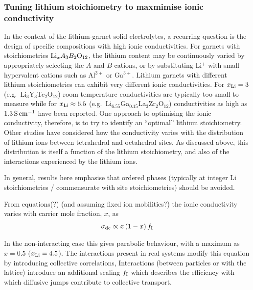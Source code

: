 \documentclass[aps,prb,twocolumn,superscriptaddress,reprint]{revtex4-1}
\newcommand{\xLi}{x_\m{Li}}
\begin{document}
\subsubsection{Tuning lithium stoichiometry to maxmimise ionic conductivity}

In the context of the lithium-garnet solid electrolytes, a recurring question is the design of specific compositions with high ionic conductivities. For garnets with stoichiometries $\mathrm{Li}_xA_3B_2\mathrm{O}_{12}$, the lithium content may be continuously varied by appropriately selecting the $A$ and $B$ cations, or by substituting Li$^+$ with small hypervalent cations such as Al$^{3+}$ or Ga$^{3+}$. Lithium garnets with different lithium stoichiometries can exhibit very different ionic conductivities. For $\xLi=3$ (e.g.\ Li$_3$Y$_3$Te$_2$O$_{12}$) room temperature conductivities are typically too small to measure\cite{OCallaghanEtAl_ChemMater2006} 
while for $\xLi\approx6.5$ (e.g.\ Li$_{6.55}$Ga$_{0.15}$La$_3$Zr$_2$O$_{12}$) conductivities as high as $1.3\,\mathrm{S}\,\mathrm{cm}^{-1}$ have been reported.\cite{Bernuy-LopezEtAl_ChemMater2014,RettenwanderEtAl_InorgChem2014} One approach to optimising the ionic conductivity, therefore, is to try to identify an  ``optimal'' lithium stoichiometry.\cite{MuruganEtAl_JElectrochemSoc2008,MuruganEtAl_Ionics2007,RamakumarEtAl_DaltonTrans2015,MiaraEtAl_ChemMater2013,XieEtAl_ChemMater2011,MuruganEtAl_MaterSciEngB2007,OCallaghanAndCussen_ChemComm2007,XuEtAl_PhysRevB2012,ChenEtAl_SciRep2017} Other studies have considered how the conductivity varies with the distribution of lithium ions between tetrahedral and octahedral sites.\cite{ChenEtAl_ChemMater2015,ThangaduraiEtAl_JAmCeramSoc2003,MuruganEtAl_MaterSciEngB2007,OCallaghanAndCussen_ChemComm2007} As discussed above, this distribution is itself a function of the lithium stoichiometry, and also of the interactions experienced by the lithium ions.

In general, results here emphasise that ordered phases (typically at integer Li stoichiometries / commensurate with site stoichiometries) should be avoided.
 
From equations(?) (and assuming fixed ion mobilities?) the ionic conductivity varies with carrier mole fraction, $x$, as
\begin{equation}
  \sigma_{\mathrm{dc}} \propto x \left(1-x\right) f_{\mathrm{I}}
\end{equation}

In the non-interacting case this gives parabolic behaviour, with a maximum as $x=0.5$ ($\xLi=4.5$).\cite{Kutner_PhysLett1981}
The interactions present in real systems modify this equation by introducing collective correlations,
Interactions (between particles or with the lattice) introduce an additional scaling $f_{\mathrm{I}}$ which describes the efficiency with which diffusive jumps contribute to collective transport.
\end{document}
